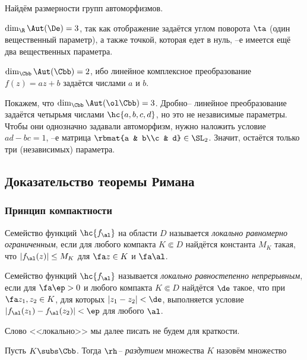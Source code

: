 \documentclass[a4paper]{article}
\begin{document}
Найдём размерности групп автоморфизмов.

\begin{points}{0}
\item $\dim_\R \Aut(\De) = 3$, так как отображение задаётся углом поворота $\ta$ (один вещественный параметр), а также
точкой, которая едет в нуль, --е имеется ещё два вещественных параметра.

\item $\dim_\Cbb \Aut(\Cbb) = 2$, ибо линейное комплексное преобразование $f(z)=az+b$ задаётся числами $a$ и $b$.

\item Покажем, что $\dim_\Cbb\Aut(\ol\Cbb)=3$. Дробно-- линейное преобразование задаётся четырьмя числами $\hc{a,b,c,d}$,
но это не независимые параметры. Чтобы они однозначно задавали автоморфизм, нужно наложить условие $ad-bc=1$, --е
матрица $\rbmat{a & b\\c & d}\in \SL_2$. Значит, остаётся только три (независимых) параметра.
\end{points}

\subsection{Доказательство теоремы Римана}

\subsubsection{Принцип компактности}

\begin{df}
Семейство функций $\hc{f_\al}$ на области $D$ называется \emph{локально равномерно ограниченным},
если для любого компакта $K \Subset D$ найдётся константа $M_K$ такая, что $|f_\al(z)| \le M_K$
для $\fa z \in K$ и $\fa \al$.
\end{df}

\begin{df}
Семейство функций $\hc{f_\al}$ называется \emph{локально равностепенно непрерывным}, если для $\fa \ep > 0$ и
любого компакта $K \Subset D$ найдётся $\de$ такое, что при $\fa z_1,z_2\in K$, для которых $|z_1 - z_2| <\de$,
выполняется условие $|f_\al(z_1)-f_\al(z_2)|< \ep$ для любого $\al$.
\end{df}

\begin{note}
Слово <<локально>> мы далее писать не будем для краткости.
\end{note}

\begin{df}
Пусть $K \subs \Cbb$. Тогда \emph{$\rh$-- раздутием} множества $K$ назовём множество
\end{df}
\end{document}
